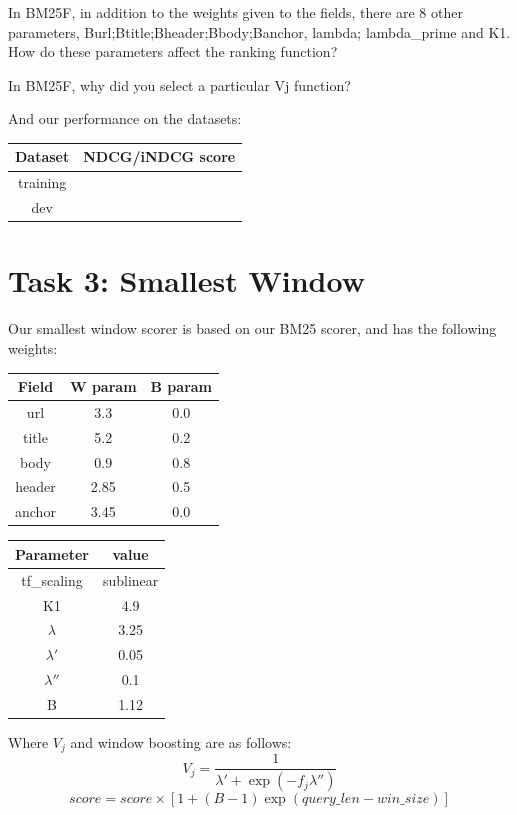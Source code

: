 \documentclass[10pt,twocolumn]{article}
\begin{document}
In BM25F, in addition to the weights given to the fields, there are
8 other parameters, Burl;Btitle;Bheader;Bbody;Banchor, lambda; lambda\_prime and K1.
How do these parameters affect the ranking function?

In BM25F, why did you select a particular Vj function?

And our performance on the datasets:
\begin{table}[H]
\centering
\begin{tabular}{|c|c|}
\hline
Dataset & NDCG/iNDCG score \\\hline
training & \\\hline
dev & \\\hline
\end{tabular}
\end{table}
\section*{Task 3: Smallest Window}
Our smallest window scorer is based on our BM25 scorer, and has the following weights:
\begin{table}[H]
\centering
\begin{tabular}{|c|c|c|}
\hline
Field & W param & B param\\\hline
url & 3.3 & 0.0\\\hline
title & 5.2 & 0.2\\\hline
body & 0.9 & 0.8\\\hline
header & 2.85 & 0.5 \\\hline
anchor & 3.45 & 0.0\\\hline
\end{tabular}
\end{table}
\begin{table}[H]
\centering
\begin{tabular}{|c|c|}
\hline
Parameter & value\\\hline
tf\_scaling & sublinear\\\hline
K1 & 4.9\\\hline
$\lambda$ & 3.25\\\hline
$\lambda'$ & 0.05\\\hline
$\lambda''$ & 0.1\\\hline
B & 1.12\\\hline
\end{tabular}
\end{table}
Where $V_j$ and window boosting are as follows:
\begin{equation*}
V_j = \frac{1}{\lambda'+\exp({-f_j\lambda''})}
\end{equation*}
\begin{equation*}
score = score \times [1+(B-1)\exp(query\_len-win\_size)]
\end{equation*}
\end{document}
